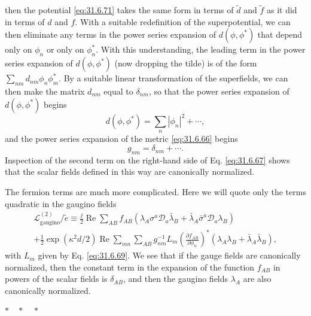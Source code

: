 then the potential \eqref{eq:31.6.71} takes the same form in terms of
\(\widetilde d\) and \(\widetilde f\) as it did in terms of \(d\) and
\(f\). With a suitable redefinition of the superpotential, we can then
eliminate any terms in the power series expansion of \(d(\phi,\phi^*)\)
that depend only on \(\phi_n\) or only on \(\phi_n^*\). With this
understanding, the leading term in the power series expansion of
\(d(\phi,\phi^*)\) (now dropping the tilde) is of the form
\(\sum_{nm}d_{nm}\phi_n\phi_m^*\). By a suitable linear transformation
of the superfields, we can then make the matrix \(d_{nm}\) equal to
\(\delta_{nm}\), so that the power series expansion of
\(d(\phi,\phi^*)\) begins
\begin{equation}
  d(\phi,\phi^*)=\sum_n|\phi_n|^2+\cdots,
  \tag{31.6.73}\label{eq:31.6.73}
\end{equation}
and the power series expansion of the metric \eqref{eq:31.6.66} begins
\begin{equation}
  g_{nm}=\delta_{nm}+\cdots.
  \tag{31.6.74}\label{eq:31.6.74}
\end{equation}
Inspection of the second term on the right-hand side of
Eq. \eqref{eq:31.6.67} shows that the scalar fields defined in this way
are canonically normalized.

The fermion terms are much more complicated. Here we will quote only
the terms quadratic in the gaugino fields
\begin{multline}
  \mathcal L_{\mathrm{gaugino}}^{(2)}/\widetilde e
  \equiv
  \frac{\ii}{2}\operatorname{Re}\sum_{AB}f_{AB}
    \left(
      \lambda_A\sigma^a\mathcal D_a\bar\lambda_B
      +\bar\lambda_A\bar\sigma^a\mathcal D_a\lambda_B
    \right)\\
  +\frac{1}{2}\exp(\kappa^2d/2)
    \operatorname{Re}\sum_{mn}\sum_{AB}
    g^{-1}_{nm}L_m
    \left(\frac{\partial f_{AB}}{\partial\phi_n}\right)^*
    \left(\lambda_A\lambda_B
          +\bar\lambda_A\bar\lambda_B\right),
  \tag{31.6.75}\label{eq:31.6.75}
\end{multline}
with \(L_m\) given by Eq. \eqref{eq:31.6.69}. We see that if the gauge
fields are canonically normalized, then the constant term in the
expansion of the function \(f_{AB}\) in powers of the scalar fields is
\(\delta_{AB}\), and then the gaugino fields \(\lambda_A\) are also
canonically normalized.

\begin{center}
  \(\ast\quad\ast\quad\ast\)
\end{center}

